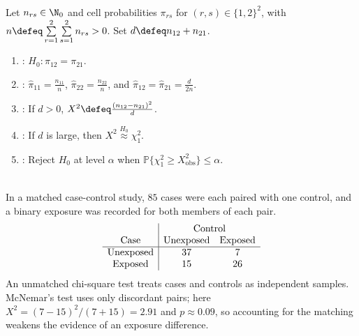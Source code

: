 \begin{method} \label{meth:mcnemars-test} \\
Let $n_{rs}\in\N_0$ and cell probabilities $\pi_{rs}$ for $(r,s)\in\{1,2\}^2$, with $n\defeq\sum\limits_{r=1}^{2}\sum\limits_{s=1}^{2}n_{rs}>0$. Set $d\defeq n_{12}+n_{21}$.
\begin{enumerate}[label=(\roman*)]
\setlength{\itemsep}{0pt}
\item {}: $H_0:\pi_{12}=\pi_{21}$.
\item {}: $\widehat{\pi}_{11}=\frac{n_{11}}{n}$, $\widehat{\pi}_{22}=\frac{n_{22}}{n}$, and $\widehat{\pi}_{12}=\widehat{\pi}_{21}=\frac{d}{2n}$.
\item {}: If $d>0$, $X^2\defeq\frac{(n_{12}-n_{21})^2}{d}$.
\item {}: If $d$ is large, then $X^2\overset{H_0}{\approx}\chi_1^2$.
\item {}: Reject $H_0$ at level $\alpha$ when $\mathbb{P}\{\chi_1^2\geq X^2_{\mathrm{obs}}\}\leq\alpha$.
\end{enumerate}
\end{method}

\begin{example} \label{ex:matched-case-control-binary-exposure} \\
In a matched case-control study, $85$ cases were each paired with one control, and a binary exposure was recorded for both members of each pair.
\[
\begin{array}{c|cc}
&\multicolumn{2}{c}{\text{Control}}\\
\text{Case}&\text{Unexposed}&\text{Exposed}\\ \hline
\text{Unexposed}&37&7\\
\text{Exposed}&15&26
\end{array}
\]
An unmatched chi-square test treats cases and controls as independent samples.\\
McNemar's test uses only discordant pairs; here $X^2=(7-15)^2/(7+15)=2.91$ and $p\approx0.09$, so accounting for the matching weakens the evidence of an exposure difference.
\end{example}

